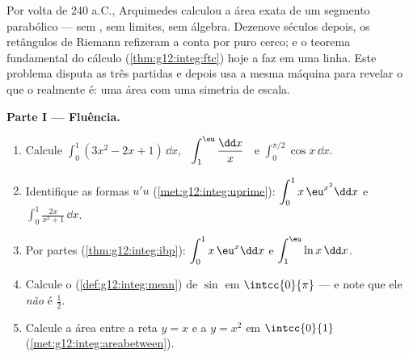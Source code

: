 \begin{problem}
\label{pb:g12:integ:1}
Por volta de 240 a.C., Arquimedes calculou a área exata de um
segmento parabólico --- sem , sem limites, sem álgebra.
Dezenove séculos depois, os retângulos de Riemann refizeram a
conta por puro cerco; e o teorema fundamental do cálculo
(\cref{thm:g12:integ:ftc}) hoje a faz em uma linha. Este problema
disputa as três partidas e depois usa a mesma máquina para revelar
o que o  realmente é: uma área com uma simetria de
escala.

\medskip
\noindent\textbf{Parte I --- Fluência.}
\begin{enumerate}
  \item Calcule $\displaystyle\int_0^1 (3x^2 - 2x + 1)\,\dd x$,
        \ $\displaystyle\int_1^{\eu} \frac{\dd x}{x}$ \ e
        $\displaystyle\int_0^{\pi/2} \cos x\,\dd x$.
  \item Identifique as formas $u'u$
        (\cref{met:g12:integ:uprime}):
        $\displaystyle\int_0^1 x\,\eu^{x^2}\dd x$ e
        $\displaystyle\int_0^1 \frac{2x}{x^2 + 1}\,\dd x$.
  \item Por partes (\cref{thm:g12:integ:ibp}):
        $\displaystyle\int_0^1 x\,\eu^x \dd x$ e
        $\displaystyle\int_1^{\eu} \ln x\,\dd x$.
  \item Calcule o  (\cref{def:g12:integ:mean}) de
        $\sin$ em $\intcc{0}{\pi}$ --- e note que ele \emph{não}
        é $\frac12$.
  \item Calcule a área entre a reta $y = x$ e a 
        $y = x^2$ em $\intcc{0}{1}$
        (\cref{met:g12:integ:areabetween}).
\end{enumerate}


\end{problem}
